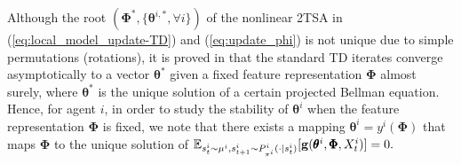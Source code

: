 \documentclass{article} %
\theoremstyle{plain}
\theoremstyle{definition}
\theoremstyle{remark}
\begin{document}
Although the root $(\pmb{\Phi}^*, \{\pmb{\theta}^{i,*}, \forall i\})$ of the nonlinear 2TSA in (\ref{eq:local_model_update-TD}) and (\ref{eq:update_phi}) is not unique due to simple permutations (rotations), it is proved in \cite{tsitsiklis1996analysis} that the standard TD iterates converge asymptotically to a vector \(\pmb{\theta}^*\) given a fixed feature representation $\pmb{\Phi}$ almost surely, where \(\pmb{\theta}^*\) is the unique solution of a certain projected Bellman equation.
Hence, for agent $i$, in order to study the stability of $\pmb{\theta}^i$ when the feature representation $\pmb{\Phi}$ is fixed, we note that there exists a mapping $\pmb{\theta}^i=y^i(\pmb{\Phi})$ that maps $\pmb{\Phi}$ to the unique solution of $\mathbb{E}_{s_t^i\sim\mu^i, s_{t+1}^i\sim P^i_{\pi^i}(\cdot|s_t^i)}[{\mathbf{g}}(\pmb{\theta}^{i}, \pmb{\Phi}, X_t^i)]=0.$ 
\end{document}

